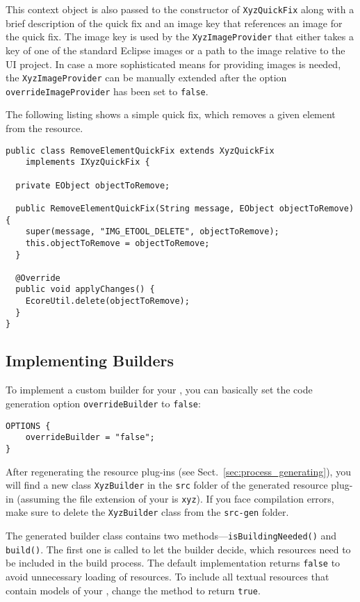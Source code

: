 This context object is also passed to the constructor of \texttt{XyzQuickFix} along
with a brief description of the quick fix and an image key that references an image 
for the quick fix. The image key is used by the \texttt{XyzImageProvider} that either
takes a key of one of the standard Eclipse images or a path to the image relative to
the UI project. In case a more sophisticated means for providing images is needed, the
\texttt{XyzImageProvider} can be manually extended after the option 
\texttt{overrideImageProvider} has been set to \texttt{false}.

The following listing shows a simple quick fix, which removes a given element from
the resource.

\begin{lstlisting}
public class RemoveElementQuickFix extends XyzQuickFix
    implements IXyzQuickFix {

  private EObject objectToRemove;

  public RemoveElementQuickFix(String message, EObject objectToRemove) {
    super(message, "IMG_ETOOL_DELETE", objectToRemove);
    this.objectToRemove = objectToRemove;
  }

  @Override
  public void applyChanges() {
    EcoreUtil.delete(objectToRemove);
  }
}
\end{lstlisting}


\subsection{Implementing Builders}
\label{sec:cust_builders}

To implement a custom builder for your \DSL, you can basically set the code
generation option \texttt{overrideBuilder} to \texttt{false}:

\begin{lstlisting}
OPTIONS {
    overrideBuilder = "false";
}
\end{lstlisting}

After regenerating the resource plug-ins (see
Sect.~\ref{sec:process_generating}), you will find a new class
\texttt{XyzBuilder} in the \texttt{src} folder of the generated resource 
plug-in (assuming the file extension of your \DSL is \texttt{xyz}). If you
face compilation errors, make sure to delete the \texttt{XyzBuilder} 
class from the \texttt{src-gen} folder.

The generated builder class contains two methods---\texttt{isBuildingNeeded()} and
\texttt{build()}. The first one is called to let the builder decide, which
resources need to be included in the build process. The default implementation
returns \texttt{false} to avoid unnecessary loading of resources. To include all
textual resources that contain models of your \DSL, change the method to return
\texttt{true}.

